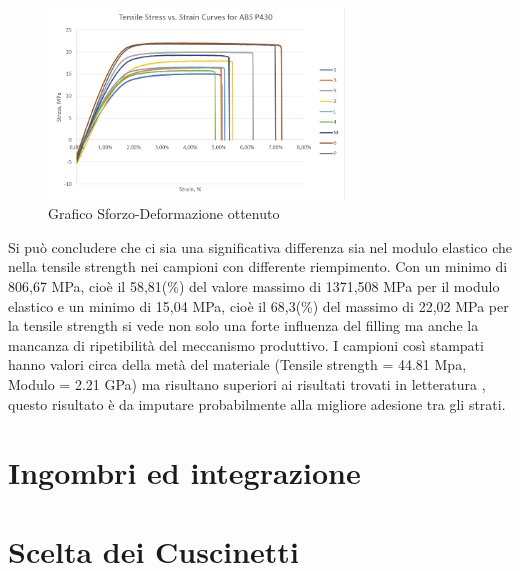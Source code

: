 \documentclass[%
corpo=11pt,
twoside,
 stile=classica,
oldstyle,
greek,%
]{toptesi}
\begin{document}
	\begin{figure}
	\centering
	\includegraphics[width=0.7\textwidth]{Screen/curvesmaterial.png}
	\caption{Grafico Sforzo-Deformazione ottenuto }
	\label{fig:graficomateriale}
\end{figure} 

Si può concludere che ci sia una significativa differenza sia nel modulo elastico che nella tensile strength nei campioni con differente riempimento. Con un minimo di 806,67 MPa, cioè il 58,81(\%) del valore massimo di 1371,508 MPa per il modulo elastico e un minimo di 15,04 MPa, cioè il 68,3(\%) del massimo di 22,02 MPa per la tensile strength si vede non solo una forte influenza del filling ma anche la mancanza di ripetibilità del meccanismo produttivo. 
I campioni così stampati hanno valori circa della metà del materiale (Tensile strength = 44.81 Mpa, Modulo = 2.21 GPa) ma risultano superiori ai risultati trovati in letteratura \cite{P430paper}, questo risultato è da imputare probabilmente alla migliore adesione tra gli strati.

	\section{Ingombri ed integrazione}
	
	\section{Scelta dei Cuscinetti}
\end{document}
